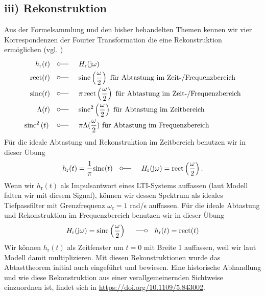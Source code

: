 \subsection*{iii) Rekonstruktion}
Aus der Formelsammlung und den bisher behandelten Themen kennen wir vier
Korrespondenzen der Fourier Transformation die eine Rekonstruktion
ermöglichen (vgl. )
\begin{align}
h_\mathrm{r}(t) \quad\fourier\quad  & H_\mathrm{r}(\im\omega)\\
\text{rect}(t) \quad\fourier\quad  &\text{sinc}\left( \frac{\omega}{2} \right)\text{ für Abtastung im Zeit-/Frequenzbereich}\\
\text{sinc}(t)  \quad\fourier\quad  &\pi \,\text{rect}\left(\frac{\omega}{2}\right)\text{ für Abtastung im Zeit-/Frequenzbereich}\\
\Lambda(t) \quad\fourier\quad  &\text{sinc}^2\left( \frac{\omega}{2} \right)  \text{ für Abtastung im Zeitbereich}\\
\text{sinc}^2\left( t \right) \quad\fourier\quad  &\pi\Lambda(\frac{\omega}{2})\text{ für Abtastung im Frequenzbereich}
\end{align}
Für die ideale Abtastung und Rekonstruktion im Zeitbereich benutzen
wir in dieser Übung
\begin{align}
h_\mathrm{r}(t) = \frac{1}{\pi}\text{sinc}(t)
\quad\fourier\quad
H_\mathrm{r}(\im\omega) = \text{rect}\left(\frac{\omega}{2}\right).
\end{align}
Wenn wir $h_\mathrm{r}(t)$ als Impulsantwort eines LTI-Systems auffassen (laut
Modell falten wir mit diesem Signal), können wir
dessen Spektrum als ideales Tiefpassfilter mit Grenzfrequenz $\omega_c=1$ rad/s auffassen.
%
Für die ideale Abtastung und Rekonstruktion im Frequenzbereich benutzen
wir in dieser Übung
\begin{align}
H_\mathrm{r}(\im\omega) = \text{sinc}\left( \frac{\omega}{2} \right)
\quad\Fourier\quad
h_\mathrm{r}(t)  = \text{rect}(t)
\end{align}
Wir können $h_\mathrm{r}(t)$ als Zeitfenster um $t=0$ mit Breite 1 auffassen,
weil wir laut Modell damit multiplizieren.
Mit diesen Rekonstruktionen wurde das Abtasttheorem initial auch eingeführt und
bewiesen. Eine historische Abhandlung und wie diese Rekonstruktion
aus einer verallgemeinernden Sichtweise einzuordnen ist, findet sich in
\url{https://doi.org/10.1109/5.843002}.

